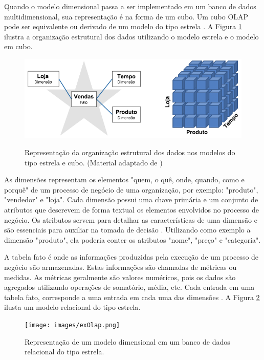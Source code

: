 Quando o modelo dimensional passa a ser implementado em um banco de dados multidimensional, sua representação é na forma de um cubo. Um cubo OLAP pode ser equivalente ou derivado de um modelo do tipo estrela \cite{KIM13}. A Figura \ref{fig:starVSolap} ilustra a organização estrutural dos dados utilizando o modelo estrela e o modelo em cubo.

\begin{figure}[h]
	\center
	\includegraphics[width=14cm]{images/starvsolap.png}
	\label{fig:starVSolap}
	\caption{Representação da organização estrutural dos dados nos modelos do tipo estrela e cubo. (Material adaptado de \cite{KIM13})}
\end{figure}

As dimensões representam os elementos "quem, o quê, onde, quando, como e porquê" de um processo de negócio de uma organização, por exemplo: "produto", "vendedor" e "loja". Cada dimensão possui uma chave primária e um conjunto de atributos que descrevem de forma textual os elementos envolvidos no processo de negócio. Os atributos servem para detalhar as características de uma dimensão e são essenciais para auxiliar na tomada de decisão \cite{KIM13}. Utilizando como exemplo a dimensão "produto", ela poderia conter os atributos "nome", "preço" e "categoria".

A tabela fato é onde as informações produzidas pela execução de um processo de negócio são armazenadas. Estas informações são chamadas de métricas ou medidas. As métricas geralmente são valores numéricos, pois os dados são agregados utilizando operações de somatório, média, etc. Cada entrada em uma tabela fato, corresponde a uma entrada em cada uma das dimensões \cite{KIM13}. A Figura \ref{fig:exOlap} ilusta um modelo relacional do tipo estrela.

\begin{figure}[h]
	\center
	\texttt{[image: images/exOlap.png]}
	\label{fig:exOlap}
	\caption{Representação de um modelo dimensional em um banco de dados relacional do tipo estrela.}
\end{figure}


